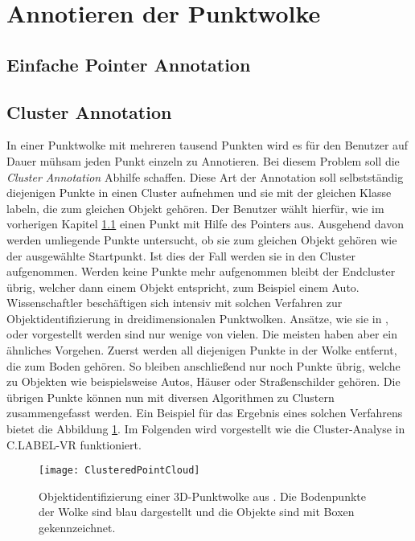 \section{Annotieren der Punktwolke}
\label{sec:Annotation}
\subsection{Einfache Pointer Annotation}
\label{sec:SimplePointerAnnotation}

\subsection{Cluster Annotation}
In einer Punktwolke mit mehreren tausend Punkten wird es für den Benutzer auf Dauer mühsam jeden Punkt einzeln zu Annotieren. Bei diesem Problem soll die \textit{Cluster Annotation} Abhilfe schaffen. Diese Art der Annotation soll selbstständig diejenigen Punkte in einen Cluster aufnehmen und sie mit der gleichen Klasse labeln, die zum gleichen Objekt gehören. Der Benutzer wählt hierfür, wie im vorherigen Kapitel \ref{sec:SimplePointerAnnotation} einen Punkt mit Hilfe des Pointers aus. Ausgehend davon werden umliegende Punkte untersucht, ob sie zum gleichen Objekt gehören wie der ausgewählte Startpunkt. Ist dies der Fall werden sie in den Cluster aufgenommen. Werden keine Punkte mehr aufgenommen bleibt der Endcluster übrig, welcher dann einem Objekt entspricht, zum Beispiel einem Auto. \\

Wissenschaftler beschäftigen sich intensiv mit solchen Verfahren zur Objektidentifizierung in dreidimensionalen Punktwolken. Ansätze, wie sie in \cite{bib:Segmentation1}, \cite{bib:Segmentation2} oder \cite{bib:Segmentation3} vorgestellt werden sind nur wenige von vielen. Die meisten haben aber ein ähnliches Vorgehen. Zuerst werden all diejenigen Punkte in der Wolke entfernt, die zum Boden gehören. So bleiben anschließend nur noch Punkte übrig, welche zu Objekten wie beispielsweise Autos, Häuser oder Straßenschilder gehören. Die übrigen Punkte können nun mit diversen Algorithmen zu Clustern zusammengefasst werden. Ein Beispiel für das Ergebnis eines solchen Verfahrens bietet die Abbildung \ref{fig:ClusteredCloud}. Im Folgenden wird vorgestellt wie die Cluster-Analyse in C.LABEL-VR funktioniert.

\begin{figure}%
	\centering
    \texttt{[image: ClusteredPointCloud]}
    \caption{Objektidentifizierung einer 3D-Punktwolke aus \cite{bib:Segmentation1}. Die Bodenpunkte der Wolke sind blau dargestellt und die Objekte sind mit Boxen gekennzeichnet.}
    \label{fig:ClusteredCloud}
\end{figure}

